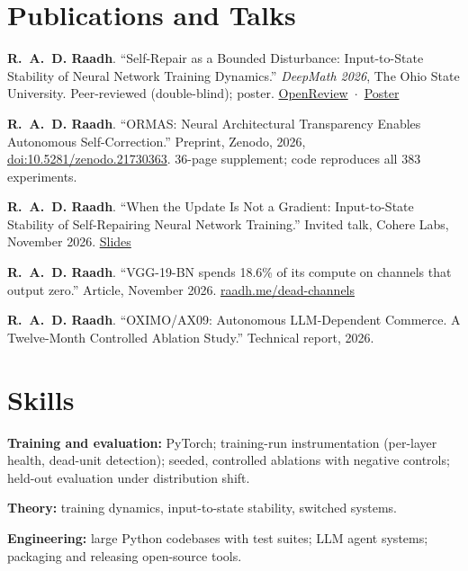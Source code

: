 \documentclass[10pt,a4paper]{article}
\begin{document}
\section*{Publications and Talks}
\begin{pubs}
  \item \textbf{R.~A.~D. Raadh}. ``Self-Repair as a Bounded Disturbance: Input-to-State Stability of Neural Network Training Dynamics.'' \textit{DeepMath 2026}, The Ohio State University. Peer-reviewed (double-blind); poster. \mbox{\href{https://openreview.net/forum?id=kowltBZEIv}{OpenReview} $\cdot$ \href{https://www.raadh.me/deepmath}{Poster}}
  \item \textbf{R.~A.~D. Raadh}. ``ORMAS: Neural Architectural Transparency Enables Autonomous Self-Correction.'' Preprint, Zenodo, 2026, \href{https://doi.org/10.5281/zenodo.21730363}{doi:10.5281/zenodo.21730363}. 36-page supplement; code reproduces all 383 experiments.
  \item \textbf{R.~A.~D. Raadh}. ``When the Update Is Not a Gradient: Input-to-State Stability of Self-Repairing Neural Network Training.'' Invited talk, Cohere Labs, November 2026. \href{https://www.raadh.me/assets/pdf/Raadh_CohereLabs_2026_When_the_Update_Is_Not_a_Gradient.pdf}{Slides}
  \item \textbf{R.~A.~D. Raadh}. ``VGG-19-BN spends 18.6\% of its compute on channels that output zero.'' Article, November 2026. \href{https://www.raadh.me/dead-channels}{raadh.me/dead-channels}
  \item \textbf{R.~A.~D. Raadh}. ``OXIMO/AX09: Autonomous LLM-Dependent Commerce. A Twelve-Month Controlled Ablation Study.'' Technical report, 2026.
\end{pubs}

\section*{Skills}
\begin{bullets}
  \item \textbf{Training and evaluation:} PyTorch; training-run instrumentation (per-layer health, dead-unit detection); seeded, controlled ablations with negative controls; held-out evaluation under distribution shift.
  \item \textbf{Theory:} training dynamics, input-to-state stability, switched systems.
  \item \textbf{Engineering:} large Python codebases with test suites; LLM agent systems; packaging and releasing open-source tools.
\end{bullets}
\end{document}
